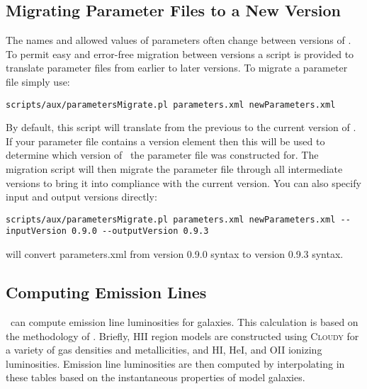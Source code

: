 \subsection{Migrating Parameter Files to a New Version}\label{sec:MigrateParameters}

The names and allowed values of parameters often change between versions of \glc. To permit easy and error-free migration between versions a script is provided to translate parameter files from earlier to later versions. To migrate a parameter file simply use:
\begin{verbatim}
scripts/aux/parametersMigrate.pl parameters.xml newParameters.xml
\end{verbatim}
By default, this script will translate from the previous to the current version of \glc. If your parameter file contains a {\normalfont \ttfamily version} element then this will be used to determine which version of \glc\ the parameter file was constructed for. The migration script will then migrate the parameter file through all intermediate versions to bring it into compliance with the current version. You can also specify input and output versions directly:
\begin{verbatim}
scripts/aux/parametersMigrate.pl parameters.xml newParameters.xml --inputVersion 0.9.0 --outputVersion 0.9.3
\end{verbatim}
will convert {\normalfont \ttfamily parameters.xml} from version 0.9.0 syntax to version 0.9.3 syntax.

\subsection{Computing Emission Lines}\label{sec:EmissionLineTutorial}

\glc\ can compute emission line luminosities for galaxies. This calculation is based on the methodology of \cite{panuzzo_dust_2003}. Briefly, HII region models are constructed using {\normalfont \scshape Cloudy} for a variety of gas densities and metallicities, and HI, HeI, and OII ionizing luminosities. Emission line luminosities are then computed by interpolating in these tables based on the instantaneous properties of model galaxies.

